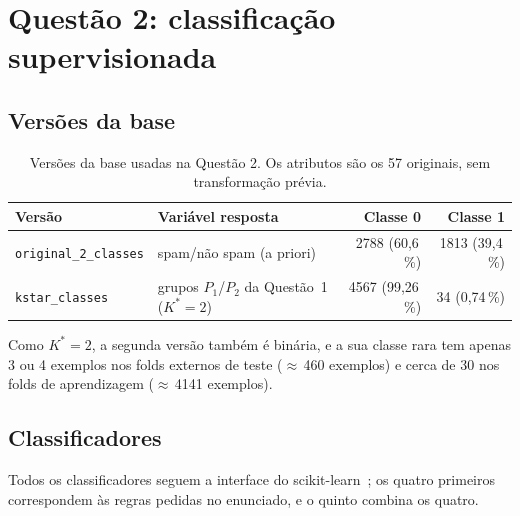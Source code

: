 \documentclass[11pt,a4paper]{article}
\begin{document}
\section{Questão 2: classificação supervisionada}\label{sec:q2}

\subsection{Versões da base}

\begin{table}[H]
\centering
\caption{Versões da base usadas na Questão 2. Os atributos são os 57 originais, sem transformação prévia.}\label{tab:versoes}
\small
\begin{tabular}{@{}l l r r@{}}
\toprule
Versão & Variável resposta & Classe 0 & Classe 1 \\
\midrule
\texttt{original\_2\_classes} & spam/não spam (a priori) & \num{2788} (60,6\,\%) & \num{1813} (39,4\,\%) \\
\texttt{kstar\_classes} & grupos $P_1$/$P_2$ da Questão~1 ($K^*=2$) & \num{4567} (99,26\,\%) & 34 (0,74\,\%) \\
\bottomrule
\end{tabular}
\end{table}

Como $K^*=2$, a segunda versão também é binária, e a sua classe rara tem apenas 3 ou 4 exemplos nos folds externos
de teste ($\approx$\,460 exemplos) e cerca de 30 nos folds de aprendizagem ($\approx$\,\num{4141} exemplos).

\subsection{Classificadores}\label{sec:classificadores}

Todos os classificadores seguem a interface do scikit-learn~\cite{pedregosa2011scikit}; os quatro primeiros correspondem às regras pedidas no
enunciado, e o quinto combina os quatro.
\end{document}
